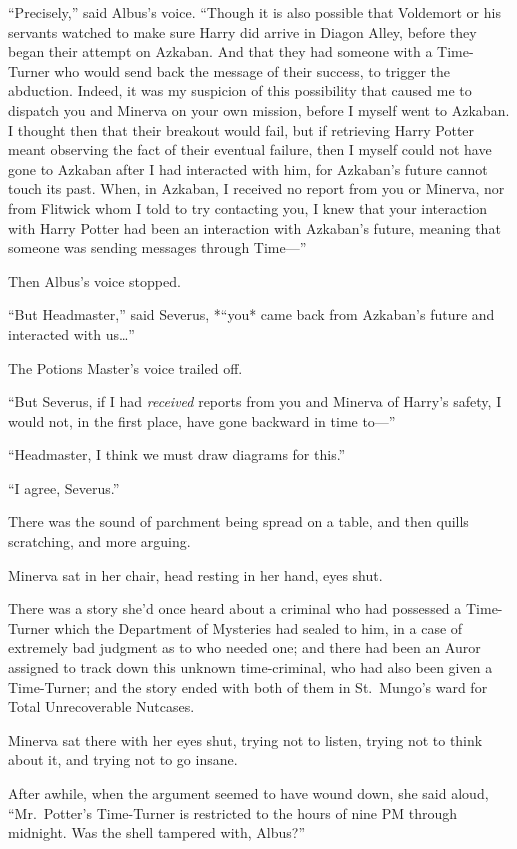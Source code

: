 ``Precisely,'' said Albus's voice. ``Though it is also possible that
Voldemort or his servants watched to make sure Harry did arrive in
Diagon Alley, before they began their attempt on Azkaban. And that they
had someone with a Time-Turner who would send back the message of their
success, to trigger the abduction. Indeed, it was my suspicion of this
possibility that caused me to dispatch you and Minerva on your own
mission, before I myself went to Azkaban. I thought then that their
breakout would fail, but if retrieving Harry Potter meant observing the
fact of their eventual failure, then I myself could not have gone to
Azkaban after I had interacted with him, for Azkaban's future cannot
touch its past. When, in Azkaban, I received no report from you or
Minerva, nor from Flitwick whom I told to try contacting you, I knew
that your interaction with Harry Potter had been an interaction with
Azkaban's future, meaning that someone was sending messages through
Time---''

Then Albus's voice stopped.

``But Headmaster,'' said Severus, *``you* came back from Azkaban's
future and interacted with us\ldots{}''

The Potions Master's voice trailed off.

``But Severus, if I had \emph{received} reports from you and Minerva of
Harry's safety, I would not, in the first place, have gone backward in
time to---''

``Headmaster, I think we must draw diagrams for this.''

``I agree, Severus.''

There was the sound of parchment being spread on a table, and then
quills scratching, and more arguing.

Minerva sat in her chair, head resting in her hand, eyes shut.

There was a story she'd once heard about a criminal who had possessed a
Time-Turner which the Department of Mysteries had sealed to him, in a
case of extremely bad judgment as to who needed one; and there had been
an Auror assigned to track down this unknown time-criminal, who had also
been given a Time-Turner; and the story ended with both of them in
St.~Mungo's ward for Total Unrecoverable Nutcases.

Minerva sat there with her eyes shut, trying not to listen, trying not
to think about it, and trying not to go insane.

After awhile, when the argument seemed to have wound down, she said
aloud, ``Mr.~Potter's Time-Turner is restricted to the hours of nine PM
through midnight. Was the shell tampered with, Albus?''

